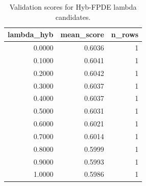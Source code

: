 \begin{table}[t]
\caption{Validation scores for Hyb-FPDE lambda candidates.}
\label{tab:lambda_distribution_computed}
\centering
\begin{tabular}{rrr}
\toprule
lambda\_hyb & mean\_score & n\_rows \\
\midrule
0.0000 & 0.6036 & 1 \\
0.1000 & 0.6041 & 1 \\
0.2000 & 0.6042 & 1 \\
0.3000 & 0.6037 & 1 \\
0.4000 & 0.6037 & 1 \\
0.5000 & 0.6031 & 1 \\
0.6000 & 0.6021 & 1 \\
0.7000 & 0.6014 & 1 \\
0.8000 & 0.5999 & 1 \\
0.9000 & 0.5993 & 1 \\
1.0000 & 0.5986 & 1 \\
\bottomrule
\end{tabular}

\end{table}
